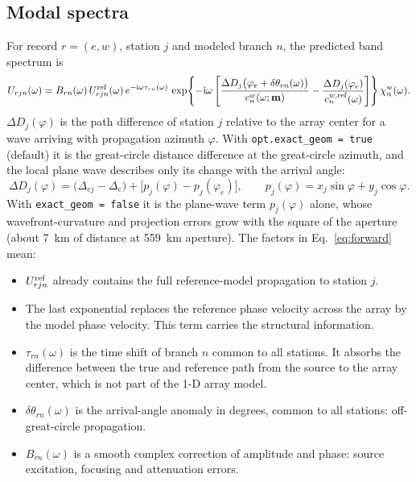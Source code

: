 \documentclass[11pt]{article}
\newcommand{\ii}{\mathrm{i}}
\begin{document}
\subsection{Modal spectra}
For record $r=(e,w)$, station $j$ and modeled branch $n$, the predicted
band spectrum is
\begin{equation}\label{eq:forward}
  U_{rjn}(\omega)=B_{rn}(\omega)\,U^{\rm ref}_{rjn}(\omega)\,
  e^{-\ii\omega\tau_{rn}(\omega)}\,
  \exp\!\left\{-\ii\omega\left[\frac{\Delta D_j\big(\varphi_e+\delta\theta_{rn}(\omega)\big)}{c^w_n(\omega;\mathbf{m})}
  -\frac{\Delta D_j(\varphi_e)}{c^{w,\rm ref}_n(\omega)}\right]\right\}\chi^w_n(\omega).
\end{equation}
$\Delta D_j(\varphi)$ is the path difference of station $j$ relative to
the array center for a wave arriving with propagation azimuth $\varphi$.
With \texttt{opt.exact\_geom = true} (default) it is the great-circle
distance difference at the great-circle azimuth, and the local plane wave
describes only its change with the arrival angle:
\begin{equation}\label{eq:geom}
  \Delta D_j(\varphi)=\big(\Delta_{ej}-\Delta_e\big)+\big[p_j(\varphi)-p_j(\varphi_e)\big],\qquad
  p_j(\varphi)=x_j\sin\varphi+y_j\cos\varphi .
\end{equation}
With \texttt{exact\_geom = false} it is the plane-wave term $p_j(\varphi)$
alone, whose wavefront-curvature and projection errors grow with the square
of the aperture (about 7~km of distance at 559~km aperture).
The factors in Eq.~\eqref{eq:forward} mean:
\begin{itemize}
\item $U^{\rm ref}_{rjn}$ already contains the full reference-model
  propagation to station $j$.
\item The last exponential replaces the reference phase velocity across
  the array by the model phase velocity. This term carries the structural
  information.
\item $\tau_{rn}(\omega)$ is the time shift of branch $n$ common to all
  stations. It absorbs the difference between the true and reference path
  from the source to the array center, which is not part of the 1-D array
  model.
\item $\delta\theta_{rn}(\omega)$ is the arrival-angle anomaly in degrees,
  common to all stations: off-great-circle propagation.
\item $B_{rn}(\omega)$ is a smooth complex correction of amplitude and phase:
  source excitation, focusing and attenuation errors.
\end{itemize}
\end{document}
